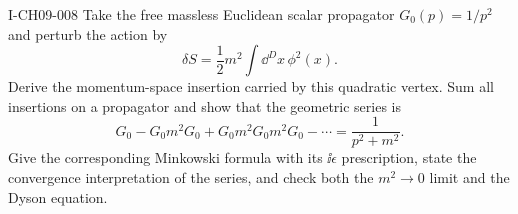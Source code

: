 \begin{exercise}{I-CH09-008}
Take the free massless Euclidean scalar propagator $G_0(p)=1/p^2$ and perturb
the action by
\[
  \delta S=\frac12m^2\int\dd^D x\,\phi^2(x).
\]
Derive the momentum-space insertion carried by this quadratic vertex.  Sum
all insertions on a propagator and show that the geometric series is
\[
  G_0-G_0m^2G_0+G_0m^2G_0m^2G_0-\cdots
  =\frac{1}{p^2+m^2}.
\]
Give the corresponding Minkowski formula with its $\ii\epsilon$ prescription,
state the convergence interpretation of the series, and check both the
$m^2\to0$ limit and the Dyson equation.
\end{exercise}
